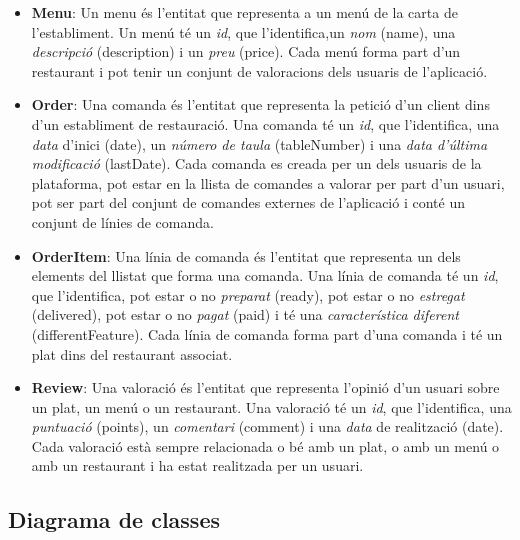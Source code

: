 \begin{itemize}
\item \textbf{Menu}: Un menu és l'entitat que representa a un menú de la carta de l'establiment. Un menú té un \textit{id}, que l'identifica,un \textit{nom} (name), una \textit{descripció} (description) i un \textit{preu} (price). Cada menú forma part d'un restaurant i pot tenir un conjunt de valoracions dels usuaris de l'aplicació.

\item \textbf{Order}: Una comanda és l'entitat que representa la petició d'un client dins d'un establiment de restauració. Una comanda té un \textit{id}, que l'identifica, una \textit{data} d'inici (date), un \textit{número de taula} (tableNumber) i una \textit{data d'última modificació} (lastDate). Cada comanda es creada per un dels usuaris de la plataforma, pot estar en la llista de comandes a valorar per part d'un usuari, pot ser part del conjunt de comandes externes de l'aplicació i conté un conjunt de línies de comanda.

\item \textbf{OrderItem}: Una línia de comanda és l'entitat que representa un dels elements del llistat que forma una comanda. Una línia de comanda té un \textit{id}, que l'identifica, pot estar o no \textit{preparat} (ready), pot estar o no \textit{estregat} (delivered), pot estar o no \textit{pagat} (paid) i té una \textit{característica diferent} (differentFeature). Cada línia de comanda forma part d'una comanda i té un plat dins del restaurant associat.

\item \textbf{Review}: Una valoració és l'entitat que representa l'opinió d'un usuari sobre un plat, un menú o un restaurant. Una valoració té un \textit{id}, que l'identifica, una \textit{puntuació} (points), un \textit{comentari} (comment) i una \textit{data} de realització (date). Cada valoració està sempre relacionada o bé amb un plat, o amb un menú o amb un restaurant i ha estat realitzada per un usuari.
\end{itemize}

\clearpage
\subsection{Diagrama de classes}

